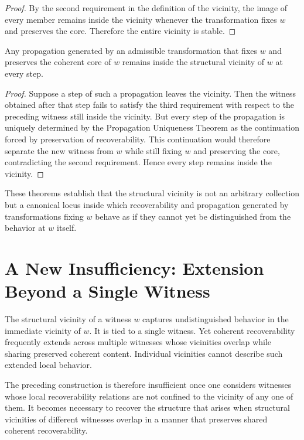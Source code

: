 \documentclass[12pt,anyside]{book}
\begin{document}
\begin{proof}
By the second requirement in the definition of the vicinity, the image of every member remains inside the vicinity whenever the transformation fixes $w$ and preserves the core. Therefore the entire vicinity is stable.
\end{proof}

\begin{theorem}
Any propagation generated by an admissible transformation that fixes $w$ and preserves the coherent core of $w$ remains inside the structural vicinity of $w$ at every step.
\end{theorem}

\begin{proof}
Suppose a step of such a propagation leaves the vicinity. Then the witness obtained after that step fails to satisfy the third requirement with respect to the preceding witness still inside the vicinity. But every step of the propagation is uniquely determined by the Propagation Uniqueness Theorem as the continuation forced by preservation of recoverability. This continuation would therefore separate the new witness from $w$ while still fixing $w$ and preserving the core, contradicting the second requirement. Hence every step remains inside the vicinity.
\end{proof}

These theorems establish that the structural vicinity is not an arbitrary collection but a canonical locus inside which recoverability and propagation generated by transformations fixing $w$ behave as if they cannot yet be distinguished from the behavior at $w$ itself.

\section{A New Insufficiency: Extension Beyond a Single Witness}
The structural vicinity of a witness $w$ captures undistinguished behavior in the immediate vicinity of $w$. It is tied to a single witness. Yet coherent recoverability frequently extends across multiple witnesses whose vicinities overlap while sharing preserved coherent content. Individual vicinities cannot describe such extended local behavior. 

The preceding construction is therefore insufficient once one considers witnesses whose local recoverability relations are not confined to the vicinity of any one of them. It becomes necessary to recover the structure that arises when structural vicinities of different witnesses overlap in a manner that preserves shared coherent recoverability.
\end{document}
